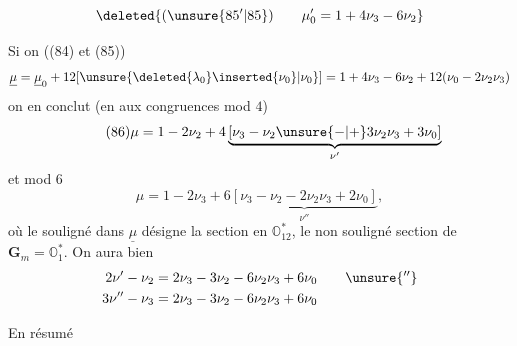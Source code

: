 \[
\deleted{(\unsure{85'|85})\qquad\mu'_0=1+4\nu_3-6\nu_2}
\]



Si on  ((84) et (85))
\[
\underline{\mu}=\underline{\mu}_0+12[\unsure{\deleted{\lambda_0}\inserted{\nu_0}|\nu_0}]
=1+4\nu_3-6\nu_2+12(\nu_0-2\nu_2\nu_3)
\]
on en conclut (en  aux congruences mod $4$)
\[
\tag{86}
\mu=1-2\nu_2+4\underbrace{[\nu_3-\nu_2\unsure{-|+}3\nu_2\nu_3+3\nu_0]}_{\nu'}
\]
et   mod $6$
\[
\tag{87}
\mu=1-2\nu_3+6\underbrace{[\nu_3-\nu_2-2\nu_2\nu_3+2\nu_0]}_{\nu''},
\]
où le souligné dans $\underline{\mu}$ désigne la section en $\mathbb O_{12}^*$, le non souligné \inserted{$\mu$}   section  de $\mathbf G_m=\mathbb O_1^*$. On aura bien
\[
\begin{aligned}
2\nu'-\nu_2&=2\nu_3-3\nu_2-6\nu_2\nu_3+6\nu_0\qquad\unsure{''}\\
3\nu''-\nu_3&=2\nu_3-3\nu_2-6\nu_2\nu_3+6\nu_0
\end{aligned}
\]

En résumé

